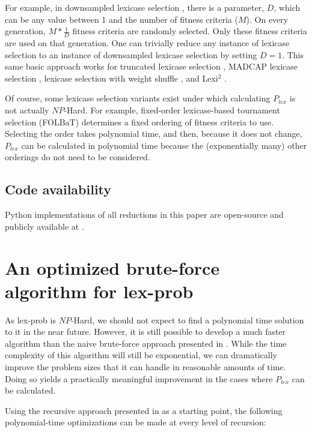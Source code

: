 \documentclass[sigconf]{acmart}
\begin{document}
For example, in downsampled lexicase selection \citep{hernandez_random_2019, ferguson_characterizing_2020}, there is a parameter, $D$, which can be any value between 1 and the number of fitness criteria ($M$). On every generation, $M*\frac{1}{D}$ fitness criteria are randomly selected. Only these fitness criteria are used on that generation. One can trivially reduce any instance of lexicase selection to an instance of downsampled lexicase selection by setting $D=1$. This same basic approach works for truncated lexicase selection \citep{spector_relaxations_2018}, MADCAP lexicase selection \citep{spector_relaxations_2018}, lexicase selection with weight shuffle \citep{troise_lexicase_2018}, and Lexi$^2$ \citep{de_lima_lexi_2022}. 

Of course, some lexicase selection variants exist under which calculating $P_{lex}$ is not actually $NP$-Hard. For example, fixed-order lexicase-based tournament selection (FOLBaT) \citep{burks_investigation_2018, troise_lexicase_2018} determines a fixed ordering of fitness criteria to use. Selecting the order takes polynomial time, and then, because it does not change, $P_{lex}$ can be calculated in polynomial time because the (exponentially many) other orderings do not need to be considered.

\subsection{Code availability}

Python implementations of all reductions in this paper are open-source and publicly available at \citep{dolsonCodeCalculatutingLexicase2023}.

\section{An optimized brute-force algorithm for {\sc lex-prob}}
\label{sec:optimized}

As {\sc lex-prob} is $NP$-Hard, we should not expect to find a polynomial time solution to it in the near future. However, it is still possible to develop a much faster algorithm than the naive brute-force approach presented in \citep{la_cava_probabilistic_2018}. While the time complexity of this algorithm will still be exponential, we can dramatically improve the problem sizes that it can handle in reasonable amounts of time. Doing so yields a practically meaningful improvement in the cases where $P_{lex}$ can be calculated.

Using the recursive approach presented in \citep{la_cava_probabilistic_2018} as a starting point, the following polynomial-time optimizations can be made at every level of recursion:
\end{document}
